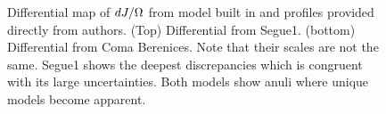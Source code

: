 \begin{figure}
    \caption{Differential map of $dJ/\Omega$ from model built in  and profiles provided directly from authors. (Top) Differential from Segue1. (bottom) Differential from Coma Berenices. Note that their scales are not the same. Segue1 shows the deepest discrepancies which is congruent with its large uncertainties. Both models show anuli where unique models become apparent.}\label{fig:gd_djmap_diff}
\end{figure}

